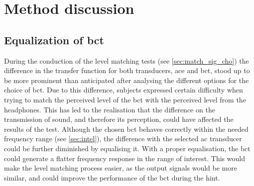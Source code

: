 \section{Method discussion}\label{sec:disc_meth}

\subsection*{Equalization of \gls{bct}}
During the conduction of the level matching tests (see \autoref{sec:match_sig_cho}) the difference in the transfer function for both transducers, \gls{ace} and \gls{bct}, stood up to be more prominent than anticipated after analysing the different options for the choice of \gls{bct}. Due to this difference, subjects expressed certain difficulty when trying to match the perceived level of the \gls{bct} with the perceived level from the headphones. This has led to the realisation that the difference on the transmission of sound, and therefore its perception, could have affected the results of the test.
Although the chosen \gls{bct} behaves correctly within the needed frequency range (see \autoref{sec:intel}), the difference with the selected \gls{ac} transducer could be further diminished by equalising it. With a proper equalisation, the \gls{bct} could generate a flatter frequency response in the range of interest. This would make the level matching process easier, as the output signals would be more similar, and could improve the performance of the \gls{bct} during the \gls{hint}.

